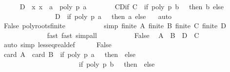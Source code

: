 \begin{isabellebody}
\ \ \ \ \isamarkupfalse%
\ {\isacharquery}D\ {\isacharequal}\ {\isachardoublequoteopen}{\isacharbraceleft}x{\isachardot}\ x\ {\isacharequal}\ a\ {\isasymand}\ poly\ p\ a\ {\isacharequal}\ {}{\isacharbraceright}{\isachardoublequoteclose}\isanewline
\ \ \ \ \isamarkupfalse%
\ CD{\isacharunderscore}if{\isacharcolon}\ {\isachardoublequoteopen}{\isacharquery}C\ {\isacharequal}\ {\isacharparenleft}if\ poly\ p\ b\ {\isacharequal}\ {}\ then\ {\isacharbraceleft}b{\isacharbraceright}\ else\ {\isacharbraceleft}{\isacharbraceright}{\isacharparenright}{\isachardoublequoteclose}\isanewline
\ \ \ \ \ \ \ \ \ \ \ \ \ \ \ \ {\isachardoublequoteopen}{\isacharquery}D\ {\isacharequal}\ {\isacharparenleft}if\ poly\ p\ a\ {\isacharequal}\ {}\ then\ {\isacharbraceleft}a{\isacharbraceright}\ else\ {\isacharbraceleft}{\isacharbraceright}{\isacharparenright}{\isachardoublequoteclose}\ \isamarkupfalse%
\ auto\isanewline
\ \ \ \ \isamarkupfalse%
\ False\ poly{\isacharunderscore}roots{\isacharunderscore}finite\ \isanewline
\ \ \ \ \ \ \ \ \isamarkupfalse%
\ {\isacharbrackleft}simp{\isacharbrackright}{\isacharcolon}\ {\isachardoublequoteopen}finite\ {\isacharquery}A{\isachardoublequoteclose}\ {\isachardoublequoteopen}finite\ {\isacharquery}B{\isachardoublequoteclose}\ {\isachardoublequoteopen}finite\ {\isacharquery}C{\isachardoublequoteclose}\ {\isachardoublequoteopen}finite\ {\isacharquery}D{\isachardoublequoteclose}\isanewline
\ \ \ \ \ \ \ \ \ \ \ \ \isamarkupfalse%
\ {\isacharparenleft}fast{\isacharcomma}\ fast{\isacharcomma}\ simp{\isacharunderscore}all{\isacharparenright}\isanewline
\ \ \ \ \isanewline
\ \ \ \ \isamarkupfalse%
\ False\ \isamarkupfalse%
\ {\isachardoublequoteopen}{\isacharquery}A\ {\isacharequal}\ {\isacharparenleft}{\isacharquery}B\ {\isasymunion}\ {\isacharquery}D{\isacharparenright}\ {\isacharminus}\ {\isacharquery}C{\isachardoublequoteclose}\ \isamarkupfalse%
\ {\isacharparenleft}auto\ simp{\isacharcolon}\ less{\isacharunderscore}eq{\isacharunderscore}real{\isacharunderscore}def{\isacharparenright}\isanewline
\ \ \ \ \isamarkupfalse%
\ False\ \isamarkupfalse%
\ {\isachardoublequoteopen}card\ {\isacharquery}A\ {\isacharequal}\ card\ {\isacharquery}B\ {\isacharplus}\ {\isacharparenleft}if\ poly\ p\ a\ {\isacharequal}\ {}\ then\ {}\ else\ {}{\isacharparenright}\ {\isacharminus}\isanewline
\ \ \ \ \ \ \ \ \ \ \ \ \ \ \ \ \ \ \ \ \ \ \ {\isacharparenleft}if\ poly\ p\ b\ {\isacharequal}\ {}\ then\ {}\ else\ {}{\isacharparenright}{\isachardoublequoteclose}\ \isamarkupfalse%

\end{isabellebody}
